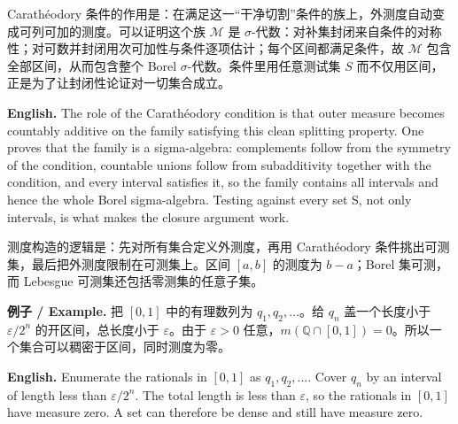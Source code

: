 \documentclass[UTF8,11pt,a4paper]{ctexart}
\newcommand{\EN}[1]{\par\noindent\textbf{English.} #1\par}
\newcommand{\EX}[2]{\par\noindent\textbf{例子 / Example.} #1\par\EN{#2}}
\begin{document}
\noindent Carath\'eodory 条件的作用是：在满足这一“干净切割”条件的族上，外测度自动变成可列可加的测度。可以证明这个族 $\mathcal M$ 是 $\sigma$-代数：对补集封闭来自条件的对称性；对可数并封闭用次可加性与条件逐项估计；每个区间都满足条件，故 $\mathcal M$ 包含全部区间，从而包含整个 Borel $\sigma$-代数。条件里用任意测试集 $S$ 而不仅用区间，正是为了让封闭性论证对一切集合成立。
\EN{The role of the Carath\'eodory condition is that outer measure becomes countably additive on the family satisfying this clean splitting property. One proves that the family is a sigma-algebra: complements follow from the symmetry of the condition, countable unions follow from subadditivity together with the condition, and every interval satisfies it, so the family contains all intervals and hence the whole Borel sigma-algebra. Testing against every set S, not only intervals, is what makes the closure argument work.}
\noindent 测度构造的逻辑是：先对所有集合定义外测度，再用 Carath\'eodory 条件挑出可测集，最后把外测度限制在可测集上。区间 $[a,b]$ 的测度为 $b-a$；Borel 集可测，而 Lebesgue 可测集还包括零测集的任意子集。
\EX{把 $[0,1]$ 中的有理数列为 $q_1,q_2,\ldots$。给 $q_n$ 盖一个长度小于 $\varepsilon/2^n$ 的开区间，总长度小于 $\varepsilon$。由于 $\varepsilon>0$ 任意，$m(\mathbb Q\cap[0,1])=0$。所以一个集合可以稠密于区间，同时测度为零。}{Enumerate the rationals in $[0,1]$ as $q_1,q_2,\ldots$. Cover $q_n$ by an interval of length less than $\varepsilon/2^n$. The total length is less than $\varepsilon$, so the rationals in $[0,1]$ have measure zero. A set can therefore be dense and still have measure zero.}
\end{document}
